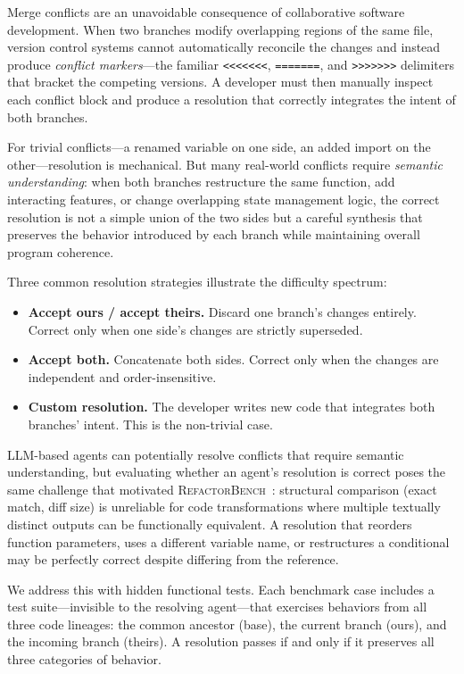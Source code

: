 \documentclass[11pt,letterpaper]{article}
\begin{document}
Merge conflicts are an unavoidable consequence of collaborative software development. When two branches modify overlapping regions of the same file, version control systems cannot automatically reconcile the changes and instead produce \emph{conflict markers}---the familiar \texttt{<{}<{}<{}<{}<{}<{}<}, \texttt{=======}, and \texttt{>{}>{}>{}>{}>{}>{}>{}} delimiters that bracket the competing versions. A developer must then manually inspect each conflict block and produce a resolution that correctly integrates the intent of both branches.

For trivial conflicts---a renamed variable on one side, an added import on the other---resolution is mechanical. But many real-world conflicts require \emph{semantic understanding}: when both branches restructure the same function, add interacting features, or change overlapping state management logic, the correct resolution is not a simple union of the two sides but a careful synthesis that preserves the behavior introduced by each branch while maintaining overall program coherence.

Three common resolution strategies illustrate the difficulty spectrum:

\begin{itemize}[leftmargin=2em]
\item \textbf{Accept ours / accept theirs.} Discard one branch's changes entirely. Correct only when one side's changes are strictly superseded.
\item \textbf{Accept both.} Concatenate both sides. Correct only when the changes are independent and order-insensitive.
\item \textbf{Custom resolution.} The developer writes new code that integrates both branches' intent. This is the non-trivial case.
\end{itemize}

LLM-based agents can potentially resolve conflicts that require semantic understanding, but evaluating whether an agent's resolution is correct poses the same challenge that motivated \textsc{RefactorBench}~\citep{chen2025refactorbench}: structural comparison (exact match, diff size) is unreliable for code transformations where multiple textually distinct outputs can be functionally equivalent. A resolution that reorders function parameters, uses a different variable name, or restructures a conditional may be perfectly correct despite differing from the reference.

We address this with hidden functional tests. Each benchmark case includes a test suite---invisible to the resolving agent---that exercises behaviors from all three code lineages: the common ancestor (base), the current branch (ours), and the incoming branch (theirs). A resolution passes if and only if it preserves all three categories of behavior.
\end{document}
